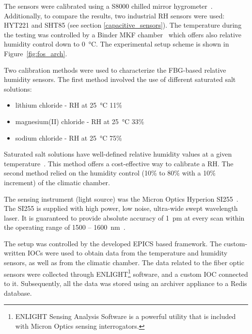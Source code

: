 The sensors were calibrated using a S8000 chilled mirror hygrometer~\cite{michell_s8000}. Additionally, to compare the results, two industrial \gls{RH} sensors were used: HYT221 and SHT85 (see section \ref{capacitive_sensors}). The temperature during the testing was controlled by a Binder MKF chamber~\cite{binder} which offers also relative humidity control down to \SI{0}{\celsius}. The experimental setup scheme is shown in Figure~\ref{fig:fos_arch}. 

Two calibration methods were used to characterize the \gls{FBG}-based relative humidity sensors. The first method involved the use of different saturated salt solutions:
\begin{itemize}
    \item lithium chloride - \gls{RH} at \SI{25}{\celsius} 11\%
    \item magnesium(II) chloride - \gls{RH} at \SI{25}{\celsius} 33\%
    \item sodium chloride - \gls{RH} at \SI{25}{\celsius} 75\%
\end{itemize}
 Saturated salt solutions have well-defined relative humidity values at a given temperature~\cite{Fossa:687857}. This method offers a cost-effective way to calibrate a \gls{RH}. The second method relied on the humidity control (10\% to 80\% with a 10\% increment) of the climatic chamber.
 
 The sensing instrument (light source) was the Micron Optics Hyperion SI255~\cite{si255}. The SI255 is supplied with high power, low noise, ultra-wide swept wavelength laser. It is guaranteed to provide absolute accuracy of 1~pm at every scan within the operating range of 1500 -- 1600~nm~\cite{si255}.

The setup was controlled by the developed \gls{EPICS} based framework. The custom-written \glspl{IOC} were used to obtain data from the temperature and humidity sensors, as well as from the climatic chamber. The data related to the fiber optic sensors were collected through ENLIGHT\footnote{ENLIGHT Sensing Analysis Software is a powerful utility that is included with Micron
Optics sensing interrogators.} software, and a custom \gls{IOC} connected to it. Subsequently, all the data was stored using an archiver appliance to a Redis database. 

